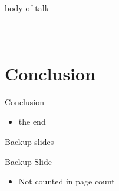 \begin{frame}{body of talk}


\begin{columns}
\column{2in}
\centering
\begin{figure}
\end{figure}

\begin{figure}
\end{figure}


\column{2in}
\centering
\begin{figure}
\end{figure}

\begin{figure}
\end{figure}

\end{columns}


\end{frame}



\section{Conclusion}

\begin{frame}{Conclusion}
\begin{itemize}
	\item
	the end

\end{itemize}
\end{frame}

\appendix
\backupbegin

\begin{frame}
\begin{center}
\Huge Backup slides
\end{center}
\end{frame}

\begin{frame}{Backup Slide}
\begin{itemize}
	\item
	Not counted in page count

\end{itemize}
\end{frame}

\backupend


